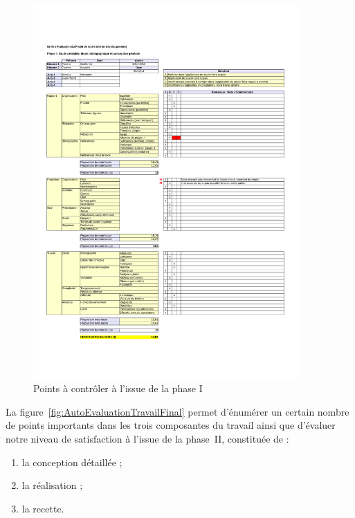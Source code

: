 \documentclass[11pt, french, screen]{report-rd-info}
\begin{document}
\begin{figure}
         \includegraphics[width=0.9\textwidth]{Images/Grille-Evaluation-PRD1}
      \fi
	\caption{Points à contrôler à l'issue de la phase I}
	\label{fig:AutoEvaluationTravailIntermediaire}
\end{figure}

La figure~\ref{fig:AutoEvaluationTravailFinal} permet d'énumérer un certain nombre de points importants dans les trois composantes du travail ainsi que d'évaluer notre niveau de satisfaction à l'issue de la phase~II, constituée de :
\begin{enumerate}
	\item la conception détaillée ;
	\item la réalisation ;
	\item la recette.
\end{enumerate}
\end{document}
